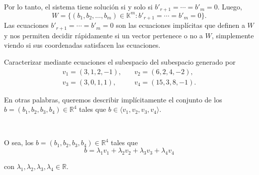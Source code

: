 \documentclass{beamer} %
\newcommand{\R}{\mathbb R}
\newcommand{\K}{\mathbb K}
\begin{document}
\begin{frame}
    Por lo tanto, el sistema tiene solución si y solo si  $b'_{r+1} = \cdots = b'_m =0$. Luego, 
    \begin{equation*}
        W = \{(b_1,b_2, \ldots,b_m) \in \K^m: b'_{r+1} = \cdots = b'_m =0\}.
    \end{equation*}
    Las ecuaciones $ b'_{r+1} = \cdots = b'_m =0$ son las ecuaciones implícitas que definen a $W$ y nos permiten decidir rápidamente si un vector pertenece o no a $W$, simplemente viendo si sus coordenadas satisfacen las ecuaciones.

\end{frame}

\begin{frame}
    \begin{ejemplo}
        Caracterizar mediante ecuaciones el subespacio del subespacio generado por 
        \begin{align*}
            v_1=(3,1,2,-1),&\quad
            v_2=(6,2,4,-2),\\
            v_3=(3,0,1,1),&\quad
            v_4=(15,3,8,-1).
            \end{align*}
    \end{ejemplo}

    \pause
    
    \begin{solucion}
        

    
    En otras palabras, queremos describir implícitamente el conjunto de los $b=(b_1,b_2,b_3,b_4)
    \in\R^4$ tales que $b\in\langle v_1, v_2, v_3, v_4\rangle$.
    
    \

    \pause
    O sea, los $b=(b_1,b_2,b_3,b_4)
    \in\R^4$ tales que 
    \begin{equation*}
        b=\lambda_1v_1+\lambda_2v_2+\lambda_3v_3+\lambda_4v_4 \tag{*}
    \end{equation*}
    
    
    con $\lambda_1,\lambda_2,\lambda_3,\lambda_4\in\R$.

    \end{solucion}

    \end{frame}
    
\end{document}
